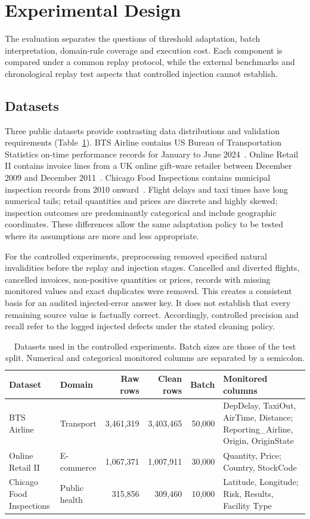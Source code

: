 \section{Experimental Design}
\label{sec:design}

The evaluation separates the questions of threshold adaptation, batch interpretation, domain-rule coverage and execution cost. Each component is compared under a common replay protocol, while the external benchmarks and chronological replay test aspects that controlled injection cannot establish.

\subsection{Datasets}
\label{sec:design:data}

Three public datasets provide contrasting data distributions and validation requirements (Table~\ref{tab:datasets}). BTS Airline contains US Bureau of Transportation Statistics on-time performance records for January to June 2024~\cite{BTS2024}. Online Retail II contains invoice lines from a UK online gift-ware retailer between December 2009 and December 2011~\cite{Chen2019}. Chicago Food Inspections contains municipal inspection records from 2010 onward~\cite{Chicago2026}. Flight delays and taxi times have long numerical tails; retail quantities and prices are discrete and highly skewed; inspection outcomes are predominantly categorical and include geographic coordinates. These differences allow the same adaptation policy to be tested where its assumptions are more and less appropriate.

For the controlled experiments, preprocessing removed specified natural invalidities before the replay and injection stages. Cancelled and diverted flights, cancelled invoices, non-positive quantities or prices, records with missing monitored values and exact duplicates were removed. This creates a consistent basis for an audited injected-error answer key. It does not establish that every remaining source value is factually correct. Accordingly, controlled precision and recall refer to the logged injected defects under the stated cleaning policy.

\begin{table}[t]
\caption{Datasets used in the controlled experiments. Batch sizes are those of the test split. Numerical and categorical monitored columns are separated by a semicolon.}
\label{tab:datasets}
\small
\begin{tabularx}{\linewidth}{@{}lXrrrX@{}}
\toprule
Dataset & Domain & Raw rows & Clean rows & Batch & Monitored columns \\
\midrule
BTS Airline & Transport & 3,461,319 & 3,403,465 & 50,000 & DepDelay, TaxiOut, AirTime, Distance; Reporting\_Airline, Origin, OriginState \\
Online Retail II & E-commerce & 1,067,371 & 1,007,911 & 30,000 & Quantity, Price; Country, StockCode \\
Chicago Food Inspections & Public health & 315,856 & 309,460 & 10,000 & Latitude, Longitude; Risk, Results, Facility Type \\
\bottomrule
\end{tabularx}
\end{table}

